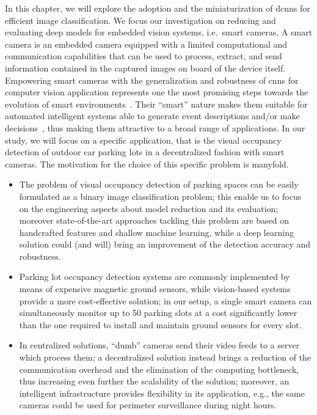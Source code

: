 In this chapter, we will explore the adoption and the miniaturization of \glspl{dcnn} for efficient image classification.
We focus our investigation on reducing and evaluating deep models for embedded vision systems, i.e.\ smart cameras.
A smart camera is an embedded camera equipped with a limited computational and communication capabilities that can be used to process, extract, and send information contained in the captured images on board of the device itself.
Empowering smart cameras with the generalization and robustness of \glspl{cnn} for computer vision application represents one the most promising steps towards the evolution of smart environments~\cite{}.
Their ``smart'' nature makes them suitable for automated intelligent systems able to generate event descriptions and/or make decisions~\cite{belbachir2010smart}, thus making them attractive to a broad range of applications.
In our study, we will focus on a specific application, that is the visual occupancy detection of outdoor car parking lots in a decentralized fashion with smart cameras.
The motivation for the choice of this specific problem is manyfold.
\begin{itemize}
	\item The problem of visual occupancy detection of parking spaces can be easily formulated as a binary image classification problem;
	this enable us to focus on the engineering aspects about model reduction and its evaluation;
	moreover state-of-the-art approaches tackling this problem are based on handcrafted features and shallow machine learning, while a deep learning solution could (and will) bring an improvement of the detection accuracy and robustness.

	\item Parking lot occupancy detection systems are commonly implemented by means of expensive magnetic ground sensors, while vision-based systems provide a more cost-effective solution;
	in our setup, a single smart camera can simultaneously monitor up to 50 parking slots at a cost significantly lower than the one required to install and maintain ground sensors for every slot.

	\item In centralized solutions, ``dumb'' cameras send their video feeds to a server which process them;
	a decentralized solution instead brings a reduction of the communication overhead and the elimination of the computing bottleneck, thus increasing even further the scalability of the solution;
	moreover, an intelligent infrastructure provides flexibility in its application, e.g., the same cameras could be used for perimeter surveillance during night hours.

\end{itemize}

